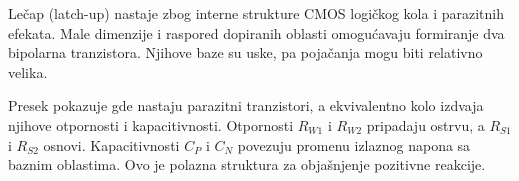 Lečap (latch-up) nastaje zbog interne strukture CMOS logičkog kola i parazitnih efekata. Male dimenzije i raspored dopiranih oblasti omogućavaju formiranje dva bipolarna tranzistora. Njihove baze su uske, pa pojačanja mogu biti relativno velika.

Presek pokazuje gde nastaju parazitni tranzistori, a ekvivalentno kolo izdvaja njihove otpornosti i kapacitivnosti. Otpornosti $R_{W1}$ i $R_{W2}$ pripadaju ostrvu, a $R_{S1}$ i $R_{S2}$ osnovi. Kapacitivnosti $C_P$ i $C_N$ povezuju promenu izlaznog napona sa baznim oblastima. Ovo je polazna struktura za objašnjenje pozitivne reakcije.
